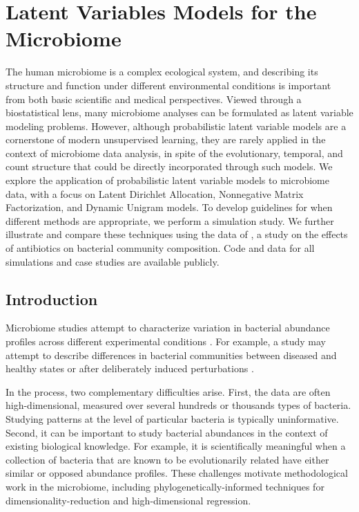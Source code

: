 \chapter{Latent Variables Models for the Microbiome}
\label{ch:text_analysis}

The human microbiome is a complex ecological system, and describing its
structure and function under different environmental conditions is important
from both basic scientific and medical perspectives. Viewed through a
biostatistical lens, many microbiome analyses can be formulated as latent
variable modeling problems. However, although probabilistic latent variable
models are a cornerstone of modern unsupervised learning, they are rarely
applied in the context of microbiome data analysis, in spite of the
evolutionary, temporal, and count structure that could be directly incorporated
through such models. We explore the application of probabilistic latent variable
models to microbiome data, with a focus on Latent Dirichlet Allocation,
Nonnegative Matrix Factorization, and Dynamic Unigram models. To develop
guidelines for when different methods are appropriate, we perform a simulation
study. We further illustrate and compare these techniques using the data of
\cite{dethlefsen2011incomplete}, a study on the effects of antibiotics on
bacterial community composition. Code and data for all simulations and case
studies are available publicly.

\section{Introduction}

Microbiome studies attempt to characterize variation in bacterial abundance
profiles across different experimental conditions \citep{gilbert2014earth}. For
example, a study may attempt to describe differences in bacterial communities
between diseased and healthy states or after deliberately induced perturbations
\citep{dethlefsen2011incomplete, fukuyama2017multidomain}.

In the process, two complementary difficulties arise. First, the data are often
high-dimensional, measured over several hundreds or thousands types of bacteria.
Studying patterns at the level of particular bacteria is typically
uninformative. Second, it can be important to study bacterial abundances in the
context of existing biological knowledge. For example, it is scientifically
meaningful when a collection of bacteria that are known to be evolutionarily
related have either similar or opposed abundance profiles. These challenges
motivate methodological work in the microbiome, including
phylogenetically-informed techniques for dimensionality-reduction and
high-dimensional regression.

